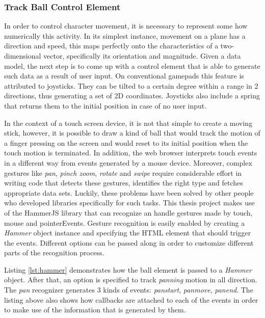 
\subsubsection{Track Ball Control Element}

In order to control character movement, it is necessary to represent some how
numerically this activity. In its simplest instance, movement on a plane has a
direction and speed, this maps perfectly onto the characteristics of a two-
dimensional vector, specifically its orientation and magnitude. Given a data
model, the next step is to come up with a control element that is able to
generate such data as a result of user input. On conventional gamepads this
feature is attributed to joysticks. They can be tilted to a certain degree
within a range in 2 directions, thus generating a set of 2D coordinates.
Joysticks also include a spring that returns them to the initial position in
case of no user input.

In the context of a touch screen device, it is not that simple to create a
moving stick, however, it is possible to draw a kind of ball that would track
the motion of a finger pressing on the screen and would reset to its initial
position when the touch motion is terminated. In addition, the web browser
interprets touch events in a different way from events generated by a mouse
device. Moreover, complex gestures like \emph{pan}, \emph{pinch zoom},
\emph{rotate} and \emph{swipe} require considerable effort in writing code that
detects these gestures, identifies the right type and fetches appropriate data
sets. Luckily, these problems have been solved by other people who developed
libraries specifically for such tasks. This thesis project makes use of the
HammerJS\cite{hammer} library that can recognize an handle gestures made by
touch, mouse and pointerEvents. Gesture recognition is easily enabled by
creating a \emph{Hammer} object instance and specifying the HTML element that
should trigger the events. Different options can be passed along in order to
customize different parts of the recognition process.



Listing \ref{lst:hammer} demonstrates how the ball element is passed to a
\emph{Hammer} object. After that, an option is specified to track \emph{panning}
motion in all direction. The \emph{pan} recognizer generates 3 kinds of events:
\emph{panstart}, \emph{panmove}, \emph{panend}. The listing above also shows how
callbacks are attached to each of the events in order to make use of the
information that is generated by them.


